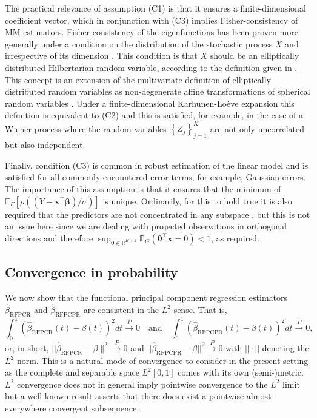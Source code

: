 \documentclass[11pt]{article}
\begin{document}
The practical relevance of assumption (C1) is that it ensures a finite-dimensional coefficient vector, which in conjunction with (C3) implies Fisher-consistency of MM-estimators. Fisher-consistency of the eigenfunctions has been proven more generally under a condition on the distribution of the stochastic process $X$ and irrespective of its dimension \citep{bali2011robust}. This condition is that $X$ should be an elliptically distributed Hilbertarian random variable, according to the definition given in \citet{bali2009principal}. This concept is an extension of the multivariate definition of elliptically distributed random variables as non-degenerate affine transformations of spherical random variables \citep[see][Chapter~6]{maronna2006robust}. Under a finite-dimensional Karhunen-Loève expansion this definition is equivalent to (C2) and this is satisfied, for example, in the case of a Wiener process where the random variables  $\left\{Z_j \right\}_{j=1}^K$ are not only uncorrelated but also independent.

Finally, condition (C3) is common in robust estimation of the linear model and is satisfied for all commonly encountered error terms, for example, Gaussian errors. The importance of this assumption is that it ensures that the minimum of $\mathbb{E}_F [\rho \left( (Y-\mathbf{x}^{\top}\boldsymbol{\beta})/\sigma \right) ]$
is unique. Ordinarily, for this to hold true it is also required that the predictors are not concentrated in any subspace \citep{yohaitec}, but this is not an issue here since we are dealing with projected observations in orthogonal directions and therefore $\sup _{\boldsymbol{\theta} \in \mathbb{R}^{K+1}}\mathbb{P}_G \left(\boldsymbol{\theta}^{\top} \mathbf{x} = 0 \right)<1$, as required.

\subsection{Convergence in probability}

We now show that the functional principal component regression estimators $\widehat{\beta}_{{\scriptscriptstyle \text{RFPCR}}}$ and $\widehat{\beta}_{{\scriptscriptstyle \text{RFPCPR}}}$ are consistent in the $L^2$ sense. That is,
\begin{equation}
\int_{0}^1 \left( \widehat{\beta}_{{\scriptscriptstyle \text{RFPCR}}}(t) - \beta(t) \right)^2 dt \xrightarrow{P} 0 \quad \text{and} \quad  \int_{0}^1 \left( \widehat{\beta}_{{\scriptscriptstyle \text{RFPCPR}}}(t) - \beta(t) \right)^2 dt \xrightarrow{P} 0,
\end{equation}
or, in short, $|| \widehat{\beta}_{{\scriptscriptstyle \text{RFPCR}}} - \beta\|^2 \xrightarrow{P} 0 $ and $|| \widehat{\beta}_{{\scriptscriptstyle \text{RFPCPR}}} - \beta||^2 \xrightarrow{P} 0 $ with $||\cdot ||$ denoting the $L^2$ norm. This is a natural mode of convergence to consider in the present setting as the complete and separable space $L^2[0,1]$ comes with its own (semi-)metric. $L^2$ convergence does not in general imply pointwise convergence to the $L^2$ limit but a well-known result asserts that there does exist a pointwise almost-everywhere convergent subsequence. 
\end{document}
